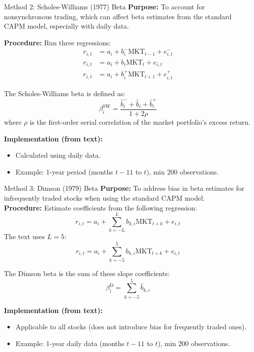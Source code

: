 \documentclass[10pt]{beamer}
\begin{document}
\begin{frame}{Method 2: Scholes-Williams (1977) Beta}
  \textbf{Purpose:} To account for nonsynchronous trading, which can affect beta estimates from the standard CAPM model, especially with daily data.

  \textbf{Procedure:} Run three regressions:
  \begin{align*}
    r_{i,t} &= a_i + b_i^{-} \text{MKT}_{t-1} + e_{i,t}^{-} \\
    r_{i,t} &= a_i + b_i \text{MKT}_{t} + e_{i,t}  \\
    r_{i,t} &= a_i + b_i^{+} \text{MKT}_{t+1} + e_{i,t}^{+}
  \end{align*}

  The Scholes-Williams beta is defined as:
  \begin{equation*}
    \beta_i^{\text{SW}} = \frac{\hat{b}_i^{-} + \hat{b}_i + \hat{b}_i^{+}}{1 + 2\rho} 
  \end{equation*}
  where $\rho$ is the first-order serial correlation of the market portfolio's excess return.

  \textbf{Implementation (from text):}
  \begin{itemize}
    \item Calculated using daily data.
    \item Example: 1-year period (months $t-11$ to $t$), min 200 observations.
  \end{itemize}
\end{frame}

\begin{frame}{Method 3: Dimson (1979) Beta}
  \textbf{Purpose:} To address bias in beta estimates for infrequently traded stocks when using the standard CAPM model.\\

  \textbf{Procedure:} Estimate coefficients from the following regression:
  \begin{equation*}
    r_{i,t} = a_i + \sum_{k=-L}^{L} b_{k,i} \text{MKT}_{t+k} + e_{i,t} 
  \end{equation*}
  The text uses $L=5$:
  \begin{equation*}
    r_{i,t} = a_i + \sum_{k=-5}^{5} b_{k,i} \text{MKT}_{t+k} + e_{i,t} 
  \end{equation*}

  The Dimson beta is the sum of these slope coefficients:
  \begin{equation*}
    \beta_i^{\text{D}} = \sum_{k=-5}^{5} \hat{b}_{k,i} 
  \end{equation*}

  \textbf{Implementation (from text):}
  \begin{itemize}
    \item Applicable to all stocks (does not introduce bias for frequently traded ones).
    \item Example: 1-year daily data (months $t-11$ to $t$), min 200 observations.
  \end{itemize}
\end{frame}
\end{document}
